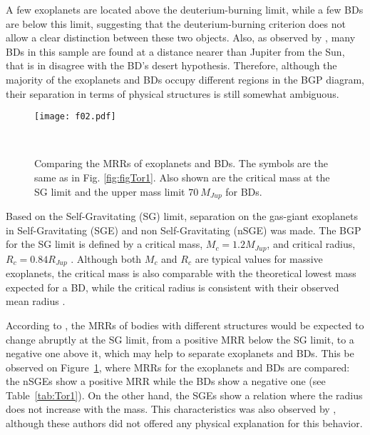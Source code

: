 A few exoplanets are located above the deuterium-burning limit, while a few BDs are below this limit, suggesting that the deuterium-burning criterion does not allow a clear distinction between these two objects. Also, as observed by \citet{Santerne2016}, many BDs in this sample are found at a distance nearer than Jupiter from the Sun, that is in disagree with the BD's desert hypothesis. 
Therefore, although the majority of the exoplanets and BDs occupy different regions in the BGP diagram, their separation in terms of physical structures is still somewhat ambiguous.   

\begin{figure}[!ht]
\centering
\texttt{[image: f02.pdf]}
\caption{Comparing the MRRs of exoplanets and BDs. The symbols are the same as in Fig. \ref{fig:figTor1}. Also shown are the critical mass at the SG limit and the upper mass limit $70~M_{Jup}$ for BDs.}\
\label{fig:figTor2}
\end{figure}

Based on the Self-Gravitating (SG) limit, separation on the gas-giant exoplanets in Self-Gravitating (SGE) and non Self-Gravitating (nSGE) was made.   
The BGP for the SG limit is defined by a critical mass, $M_c=1.2 M_{Jup}$, and critical radius, $R_c=0.84 R_{Jup}$ \citep{Padmanabhan1993}. 
Although both $M_c$ and $R_c$ are typical values 
for massive exoplanets, the critical mass is also comparable with the 
theoretical lowest mass expected for a BD, while the critical radius
is consistent with their observed mean radius \citep{Burgasser2008,Basri2006,Sorahana2013}.  

According to \citet{Padmanabhan1993}, the MRRs of 
bodies with different structures would be expected to change abruptly at the 
SG limit, from a positive MRR below the SG limit, to a negative one above it, which may help to separate exoplanets and BDs. 
This be observed on Figure~\ref{fig:figTor2}, where MRRs for the exoplanets and BDs are compared: the nSGEs show a positive MRR while the BDs show a negative one (see Table~\ref{tab:Tor1}). On the other hand, the SGEs show a relation where the radius does not increase with the mass. This characteristics was also observed by \citet{Hatzes2015}, although these authors did not offered any physical explanation for this behavior. 

